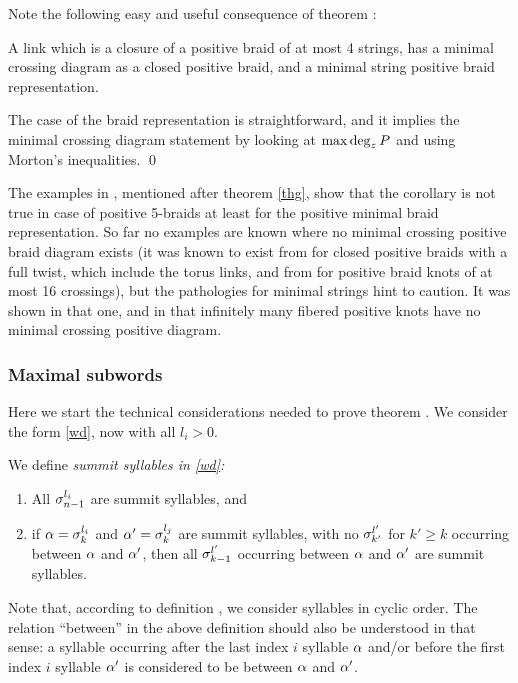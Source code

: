 Note the following easy and useful consequence of theorem 
:

\begin{corr}
A link which is a closure of a positive braid of at most 4 strings,
has a minimal crossing diagram as a closed positive braid, and a
minimal string positive braid representation.
\end{corr}

\proof The case of the braid representation is straightforward,
and it implies the minimal crossing diagram statement by
looking at $\max\deg_zP$ and using Morton's inequalities. \qed

The examples in \cite{posex_bcr}, mentioned after theorem \ref{thg},
show that the corollary is not true in case of positive 5-braids at
least for the positive minimal braid representation. So far no examples
are known where no minimal crossing positive braid diagram exists
(it was known to exist from \cite{WilFr,Murasugi} for closed
positive braids with a full twist, which include the torus links,
and from \cite{posex_bcr} for positive braid knots of at most
16 crossings), but the pathologies for minimal strings hint to caution.
It was shown in \cite{posex_bcr} that one, and in \cite{ntriv} that
infinitely many fibered positive knots
have no minimal crossing positive diagram.

\subsubsection{Maximal subwords}

Here we start the technical considerations needed to prove 
theorem . We consider the form \eqref{wd},
now with all $l_i>0$.

\begin{defi}
We define \em{summit syllables} in \eqref{wd}:
\def\theenumi{\alph{enumi}}
\def\labelenumi{\theenumi)}
\begin{enumerate}
\item All $\sigma_{n-1}^{l_i}$ are summit syllables, and
\item if $\alpha=\sigma_k^{l_i}$ and $\alpha'=\sigma_k^{l_j}$ are summit
syllables, with no $\sigma_{k'}^{l'}$ for $k'\ge k$ occurring between
$\alpha$ and $\alpha'$, then all $\sigma_{k-1}^{l'}$ occurring between $\alpha$
and $\alpha'$ are summit syllables.
\end{enumerate}
\end{defi}

Note that, according to definition , we
consider syllables in cyclic order. The relation ``between'' in
the above definition should also be understood in that sense:
a syllable occurring after the last index $i$ syllable
$\alpha$ and/or before the first index $i$ syllable $\alpha'$ is
considered to be between $\alpha$ and $\alpha'$.

